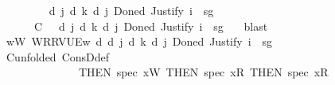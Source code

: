 \begin{isabellebody}
\isanewline
\ \ \ \ \isamarkupfalse%
\ {\isachardoublequoteopen}{\isasymexists}{\isasymDelta}{\isachardot}{\kern0pt}\ {\isasymGamma}\ {\isasymTurnstile}\ {\isasymD}\isactrlsup d\ j\ {\isacharparenleft}{\kern0pt}{\isasymB}\isactrlsup d\ k\ {\isacharparenleft}{\kern0pt}{\isasymD}\isactrlsup d\ j\ {\isacharparenleft}{\kern0pt}Done\isactrlsup d\ {\isacharparenleft}{\kern0pt}Justify\ i\ {\isasymDelta}\ sg\ {\isasymphi}{\isacharparenright}{\kern0pt}{\isacharparenright}{\kern0pt}{\isacharparenright}{\kern0pt}{\isacharparenright}{\kern0pt}{\isachardoublequoteclose}\isanewline
\ \ \ \ \isamarkupfalse%
\ \isamarkupfalse%
\ {\isasymDelta}\ \isanewline
\ \ \ \ \ \ C{\isacharcolon}{\kern0pt}\ {\isachardoublequoteopen}{\isasymGamma}\ {\isasymTurnstile}\ {\isasymD}\isactrlsup d\ j\ {\isacharparenleft}{\kern0pt}{\isasymB}\isactrlsup d\ k\ {\isacharparenleft}{\kern0pt}{\isasymD}\isactrlsup d\ j\ {\isacharparenleft}{\kern0pt}Done\isactrlsup d\ {\isacharparenleft}{\kern0pt}Justify\ i\ {\isasymDelta}\ sg\ {\isasymphi}{\isacharparenright}{\kern0pt}{\isacharparenright}{\kern0pt}{\isacharparenright}{\kern0pt}{\isacharparenright}{\kern0pt}{\isachardoublequoteclose}\ \isamarkupfalse%
\ blast\isanewline
\ \ \ \ \isamarkupfalse%
\ {\isachardoublequoteopen}{\isasymforall}w{\isacharcolon}{\kern0pt}{\isacharquery}{\kern0pt}W{\isachardot}{\kern0pt}\ {\isasymlangle}{\isacharquery}{\kern0pt}W{\isacharcomma}{\kern0pt}{\isacharquery}{\kern0pt}R{\isacharcomma}{\kern0pt}{\isacharquery}{\kern0pt}R{\isacharcomma}{\kern0pt}V{\isacharcomma}{\kern0pt}{\isacharquery}{\kern0pt}U{\isacharcomma}{\kern0pt}E{\isasymrangle}{\isacharcomma}{\kern0pt}w\ {\isasymTurnstile}\isactrlsup d\ {\isasymD}\isactrlsup d\ j\ {\isacharparenleft}{\kern0pt}{\isasymB}\isactrlsup d\ k\ {\isacharparenleft}{\kern0pt}{\isasymD}\isactrlsup d\ j\ {\isacharparenleft}{\kern0pt}Done\isactrlsup d\ {\isacharparenleft}{\kern0pt}Justify\ i\ {\isasymDelta}\ sg\ {\isasymphi}{\isacharparenright}{\kern0pt}{\isacharparenright}{\kern0pt}{\isacharparenright}{\kern0pt}{\isacharparenright}{\kern0pt}{\isachardoublequoteclose}\isanewline
\ \ \ \ \ \ \isamarkupfalse%
\ C{\isacharbrackleft}{\kern0pt}unfolded\ ConsD{\isacharunderscore}{\kern0pt}def{\isacharcomma}{\kern0pt}\isanewline
\ \ \ \ \ \ \ \ \ \ \ \ \ \ THEN\ spec{\isacharbrackleft}{\kern0pt}\ x{\isacharequal}{\kern0pt}{\isachardoublequoteopen}{\isacharquery}{\kern0pt}W{\isachardoublequoteclose}{\isacharbrackright}{\kern0pt}{\isacharcomma}{\kern0pt}\ THEN\ spec{\isacharbrackleft}{\kern0pt}\ x{\isacharequal}{\kern0pt}{\isachardoublequoteopen}{\isacharquery}{\kern0pt}R{\isachardoublequoteclose}{\isacharbrackright}{\kern0pt}{\isacharcomma}{\kern0pt}\ THEN\ spec{\isacharbrackleft}{\kern0pt}\ x{\isacharequal}{\kern0pt}{\isachardoublequoteopen}{\isacharquery}{\kern0pt}R{\isachardoublequoteclose}{\isacharbrackright}{\kern0pt}{\isacharcomma}{\kern0pt}\isanewline

\end{isabellebody}
